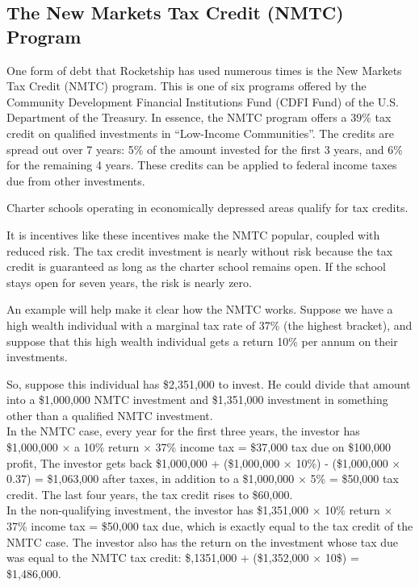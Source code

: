 \subsection{The New Markets Tax Credit (NMTC) Program}%
\label{sec:NMTC}\indent%

One form of debt that Rocketship has used numerous times is the New Markets Tax Credit (NMTC) program. This is one of six programs offered by the Community Development Financial Institutions Fund (CDFI Fund) of the U.S. Department of the Treasury. In essence, the NMTC program offers a 39\% tax credit on qualified investments in ``Low-Income Communities''. The credits are spread out over 7 years: 5\% of the amount invested for the first 3 years, and 6\% for the remaining 4 years. These credits can be applied to federal income taxes due from other investments. 

Charter schools operating in economically depressed areas qualify for tax credits. 

It is incentives like these incentives make the NMTC popular, coupled with reduced risk. The tax credit investment is nearly without risk because the tax credit is guaranteed as long as the charter school remains open. If the school stays open for seven years, the risk is nearly zero.

An example will help make it clear how the NMTC works. Suppose we have a high wealth individual with a marginal tax rate of 37\% (the highest bracket), and suppose that this high wealth individual gets a return 10\% per annum on their investments.

So, suppose this individual has \$2,351,000 to invest. He could divide that amount into a \$1,000,000 NMTC investment and \$1,351,000 investment in something other than a qualified NMTC investment. \\

In the NMTC case, every year for the first three years, the investor has \$1,000,000 $\times$ a 10\% return $\times$ 37\% income tax = \$37,000 tax due on \$100,000 profit, The investor gets back \$1,000,000 + (\$1,000,000 × 10\%) - (\$1,000,000 × 0.37) = \$1,063,000 after taxes, in addition to a \$1,000,000 × 5\% = \$50,000 tax credit. The last four years, the tax credit rises to \$60,000. \\
  
In the non-qualifying investment, the investor has \$1,351,000 $\times$ 10\% return $\times$ 37\% income tax = \$50,000 tax due, which is exactly equal to the tax credit of the NMTC case. The investor also has the return on the investment whose tax due was equal to the NMTC tax credit: \$,1351,000 + (\$1,352,000 $\times$ 10\$) = \$1,486,000.\\

